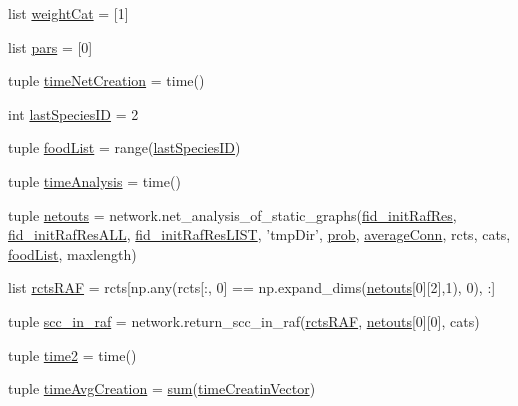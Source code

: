 \begin{DoxyCompactItemize}
\item 
list \hyperlink{a00157_a67cf979bfd8cf26867524a1a788a5e63}{weight\-Cat} = \mbox{[}1\mbox{]}
\item 
list \hyperlink{a00157_a516f339905d01b02a4e16181f2fde4be}{pars} = \mbox{[}0\mbox{]}
\item 
tuple \hyperlink{a00157_a2f85d448268dd44ad47f66b65bfa45b6}{time\-Net\-Creation} = time()
\item 
int \hyperlink{a00157_a1aa5d59ebf308accb3c960b5fd90a445}{last\-Species\-I\-D} = 2
\item 
tuple \hyperlink{a00157_a96850fa3d62df1176a8d7a5b988f4a32}{food\-List} = range(\hyperlink{a00157_a1aa5d59ebf308accb3c960b5fd90a445}{last\-Species\-I\-D})
\item 
tuple \hyperlink{a00157_ace5bda70ff24e6a220afb4438240003a}{time\-Analysis} = time()
\item 
tuple \hyperlink{a00157_af42f57da8ba80463f419efaf0f6f2c33}{netouts} = network.\-net\-\_\-analysis\-\_\-of\-\_\-static\-\_\-graphs(\hyperlink{a00157_aa47d62b7ce95f5c4e730d081209770c2}{fid\-\_\-init\-Raf\-Res}, \hyperlink{a00157_afcacf140d9efed55635e8dcd084db870}{fid\-\_\-init\-Raf\-Res\-A\-L\-L}, \hyperlink{a00157_abca13a03834449d5629252329999f1a3}{fid\-\_\-init\-Raf\-Res\-L\-I\-S\-T}, 'tmp\-Dir', \hyperlink{a00157_aad2c05e3d2146196ed236911dd796f6e}{prob}, \hyperlink{a00157_a0d59133b2bb42e7aa26a3dba3a2a9a70}{average\-Conn}, rcts, cats, \hyperlink{a00157_a96850fa3d62df1176a8d7a5b988f4a32}{food\-List}, maxlength)
\item 
list \hyperlink{a00157_aeb909c76682b690cc5ab6aca5ac37c4d}{rcts\-R\-A\-F} = rcts\mbox{[}np.\-any(rcts\mbox{[}\-:, 0\mbox{]} == np.\-expand\-\_\-dims(\hyperlink{a00157_af42f57da8ba80463f419efaf0f6f2c33}{netouts}\mbox{[}0\mbox{]}\mbox{[}2\mbox{]},1), 0), \-:\mbox{]}
\item 
tuple \hyperlink{a00157_ac864e2a75b705766c1d81f68897f52c0}{scc\-\_\-in\-\_\-raf} = network.\-return\-\_\-scc\-\_\-in\-\_\-raf(\hyperlink{a00157_aeb909c76682b690cc5ab6aca5ac37c4d}{rcts\-R\-A\-F}, \hyperlink{a00157_af42f57da8ba80463f419efaf0f6f2c33}{netouts}\mbox{[}0\mbox{]}\mbox{[}0\mbox{]}, cats)
\item 
tuple \hyperlink{a00157_a44666efa43bfc08ab8305c8d325f7456}{time2} = time()
\item 
tuple \hyperlink{a00157_a4cd61f10a5a0a8d80608e71a1fc2009c}{time\-Avg\-Creation} = \hyperlink{a00106_a59a869fb2b28d56dacd91c09e1dffc8d}{sum}(\hyperlink{a00157_a0527a0989312340a402661aebc675d30}{time\-Creatin\-Vector})
\item 

\end{DoxyCompactItemize}
